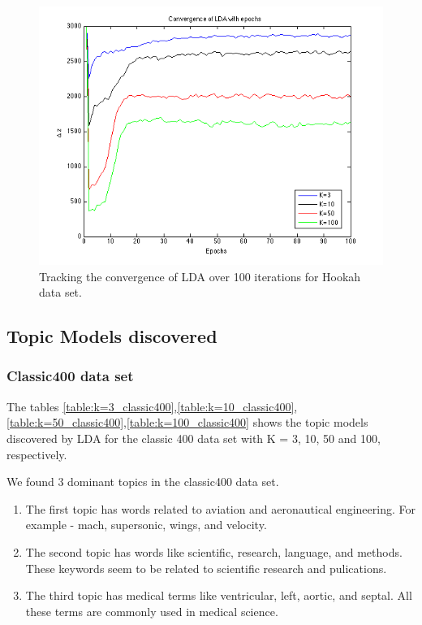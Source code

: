 \documentclass[11pt,a4paper,oneside]{article}
\begin{document}
\begin{figure}[H]
\centering
\includegraphics[width=\columnwidth]{hookah_convergence}
\caption{Tracking the convergence of LDA over 100 iterations for Hookah data set.}
\label{fig:hookah_convergence}
\end{figure}

\subsection{Topic Models discovered}
\subsubsection{Classic400 data set}
The tables \ref{table:k=3_classic400},\ref{table:k=10_classic400},\ref{table:k=50_classic400},\ref{table:k=100_classic400} shows the topic models discovered by LDA for the classic 400 data set with K = 3, 10, 50 and 100, respectively. 

We found 3 dominant topics in the classic400 data set. 
\begin{enumerate}
\item The first topic has words related to aviation and aeronautical engineering. For example - mach, supersonic, wings, and velocity.
\item The second topic has words like scientific, research, language, and methods. These keywords seem to be related to scientific research and pulications.
\item The third topic has medical terms like ventricular, left, aortic, and septal. All these terms are commonly used in medical science.
\end{enumerate}
\end{document}
